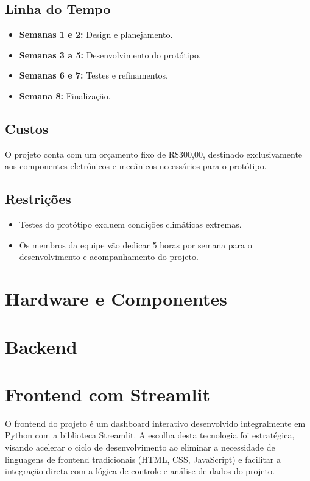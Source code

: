 \documentclass{article}
\begin{document}
\subsection{Linha do Tempo}
\begin{itemize}
    \item \textbf{Semanas 1 e 2:} Design e planejamento.
    \item \textbf{Semanas 3 a 5:} Desenvolvimento do protótipo.
    \item \textbf{Semanas 6 e 7:} Testes e refinamentos.
    \item \textbf{Semana 8:} Finalização.
\end{itemize}

\subsection{Custos}
O projeto conta com um orçamento fixo de R\$300,00, destinado exclusivamente aos componentes eletrônicos e mecânicos necessários para o protótipo.

\subsection{Restrições}
\begin{itemize}
    \item Testes do protótipo excluem condições climáticas extremas.
    \item Os membros da equipe vão dedicar 5 horas por semana para o desenvolvimento e acompanhamento do projeto.
\end{itemize}

\section{Hardware e Componentes}

\section{Backend}

\section{Frontend com Streamlit}
O frontend do projeto é um dashboard interativo desenvolvido integralmente em Python com a biblioteca Streamlit. A escolha desta tecnologia foi estratégica, visando acelerar o ciclo de desenvolvimento ao eliminar a necessidade de linguagens de frontend tradicionais (HTML, CSS, JavaScript) e facilitar a integração direta com a lógica de controle e análise de dados do projeto.
\end{document}
